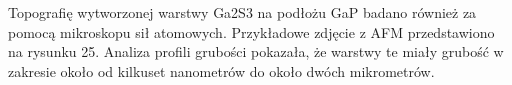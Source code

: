 Topografię wytworzonej warstwy Ga2S3 na podłożu GaP badano również za pomocą mikroskopu sił atomowych. Przykładowe zdjęcie z AFM przedstawiono na rysunku 25. Analiza profili grubości pokazała, że warstwy te miały grubość w zakresie około od kilkuset nanometrów do około dwóch mikrometrów.
























 